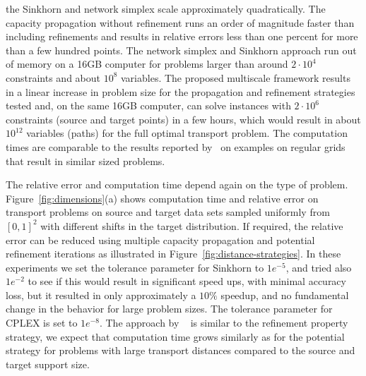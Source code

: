 \documentclass[twoside,11pt]{article}
\begin{document}
the Sinkhorn and network simplex scale approximately quadratically. The
capacity propagation without refinement runs an order of magnitude faster than
including refinements and results in relative errors less than one percent for
more than a few hundred points.  The network simplex and Sinkhorn approach run
out of memory on a 16GB computer for problems larger than around $2\cdot10^4$
constraints and about $10^8$ variables. The proposed multiscale framework
results in a linear increase in problem size for the propagation and refinement
strategies tested and, on the same 16GB computer, can solve instances with
$2\cdot10^6$ constraints (source and target points) in a few hours, which would
result in about $10^{12}$ variables (paths) for the full optimal transport
problem.  The computation times are comparable to the results reported
by~\citet{oberman2015efficient,schmitzer2015sparse} on examples on regular grids
that result in similar sized problems. 

The relative error and computation time depend again on the type of problem.
Figure~\ref{fig:dimensions}(a) shows computation time and relative error
on transport problems on source and target data sets sampled uniformly from
$[0,1]^2$ with different shifts in the target distribution. If required, the
relative error can be reduced using multiple capacity propagation and potential
refinement iterations as illustrated in Figure~\ref{fig:distance-strategies}.
In these experiments we set the tolerance parameter for Sinkhorn to $1e^{-5}$, and
tried also $1e^{-2}$ to see if this would result in significant speed ups, with
minimal accuracy loss, but it resulted in only approximately a $10\%$ speedup,
and no fundamental change in the behavior for large problem sizes. The
tolerance parameter for CPLEX is set to $1e^{-8}$. The approach by
~\citet{schmitzer2015sparse} is similar to the refinement property strategy, we
expect that computation time grows similarly as for the potential strategy for
problems with large transport distances compared to the source and target
support size.
\end{document}
